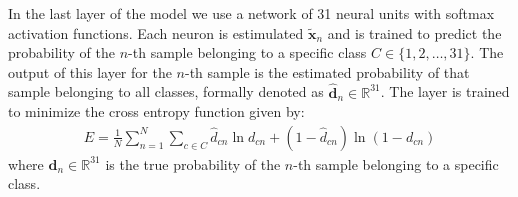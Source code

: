 In the last layer of the model we use a network of 31 neural units with softmax
activation functions. Each neuron is estimulated $\mathbf{\tilde{x}}_n$ and is
trained to predict the probability of the $n$-th sample belonging to a specific
class $C \in \{1, 2, \dots, 31\}$. The output of this layer for the $n$-th
sample is the estimated probability of that sample belonging to all classes, 
formally denoted as $\mathbf{\hat{d}}_n \in \mathbb{R}^{31}$. The layer is trained to minimize
the cross entropy function \cite{szegedy2016rethinking} given by:
\begin{align}
E=\frac{1}{N} \sum_{n=1}^N \sum_{c \in C} \hat{d}_{cn} \ln d_{cn} + (1 -
\hat{d}_{cn}) \ln (1 - d_{cn}) 
\label{eq:entropy}
\end{align}
where $\mathbf{d}_n \in \mathbb{R}^{31}$ is the true probability of the $n$-th
sample belonging to a specific class. 

